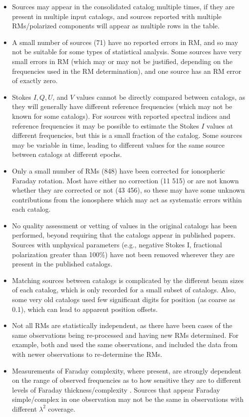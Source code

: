 \documentclass[10pt,modern]{aastex63}
\begin{document}
\begin{itemize}
\item Sources may appear in the consolidated catalog multiple times, if they are present in multiple input catalogs, and sources reported with multiple RMs/polarized components will appear as multiple rows in the table. 
\item A small number of sources (71) have no reported errors in RM, and so may not be suitable for some types of statistical analysis. Some sources have very small errors in RM (which may or may not be justified, depending on the frequencies used in the RM determination), and one source has an RM error of exactly zero.
\item Stokes $I, Q, U$, and $V$ values cannot be directly compared between catalogs, as they will generally have different reference frequencies (which may not be known for some catalogs). For sources with reported spectral indices and reference frequencies it may be possible to estimate the Stokes $I$ values at different frequencies, but this is a small fraction of the catalog. Some sources may be variable in time, leading to different values for the same source between catalogs at different epochs.
\item Only a small number of RMs (848) have been corrected for ionospheric Faraday rotation. Most have either no correction (11 515) or are not known whether they are corrected or not (43 456), so these may have some unknown contributions from the ionosphere which may act as systematic errors within each catalog.
\item No quality assessment or vetting of values in the original catalogs has been performed, beyond requiring that the catalogs appear in published papers. Sources with unphysical parameters (e.g., negative Stokes I, fractional polarization greater than 100\%) have not been removed wherever they are present in the published catalogs.
\item Matching sources between catalogs is complicated by the different beam sizes of each catalog, which is only recorded for a small subset of catalogs. Also, some very old catalogs used few significant digits for position (as coarse as 0.1\degr), which can lead to apparent position offsets.
\item Not all RMs are statistically independent, as there have been cases of the same observations being re-processed and having new RMs determined. For example, both \citet{Brown2003} and \citet{VanEck2021} used the same observations, and \citet{Rossetti2008} included the data from \citet{Klein2003} with newer observations to re-determine the RMs.
\item Measurements of Faraday complexity, where present, are strongly dependent on the range of observed frequencies as to how sensitive they are to different levels of Faraday thickness/complexity \citep{Anderson2016}. Sources that appear Faraday simple/complex in one observation may not be the same in observations with different $\lambda^2$ coverage.
\end{itemize}
\end{document}
